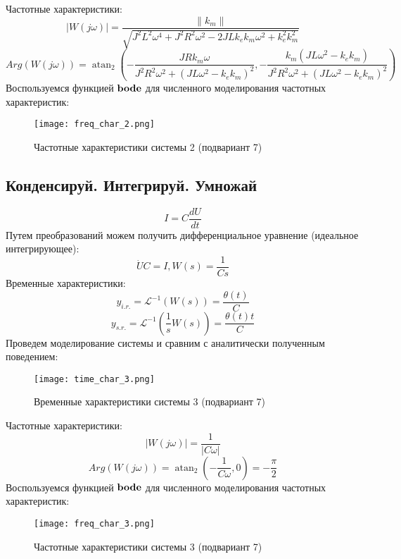 Частотные характеристики:
\begin{equation*}
    |W(j\omega)| = \frac{\|{k_{m}}\|}{\sqrt{J^{2} L^{2} \omega^{4} + J^{2} R^{2} \omega^{2} - 2 J L k_{e} k_{m} \omega^{2} + k_{e}^{2} k_{m}^{2}}}
\end{equation*}
\begin{equation*}
    Arg(W(j\omega)) = \operatorname{atan}_{2}{(- \frac{J R k_{m} \omega}{J^{2} R^{2} \omega^{2} + (J L \omega^{2} - k_{e} k_{m})^{2}},- \frac{k_{m} (J L \omega^{2} - k_{e} k_{m})}{J^{2} R^{2} \omega^{2} + (J L \omega^{2} - k_{e} k_{m})^{2}} )}
\end{equation*}
Воспользуемся функцией $\bold{bode}$ для численного моделирования частотных характеристик:
\begin{figure}[h]
    \centering
    \texttt{[image: freq\_char\_2.png]}
    \caption{\label{fig:The-caption-1}Частотные характеристики системы 2 (подвариант 7)}
\end{figure}
\pagebreak

\subsection*{Конденсируй. Интегрируй. Умножай}
\begin{equation}
    I = C\frac{dU}{dt}
\end{equation}
Путем преобразований можем получить дифференциальное уравнение (идеальное интегрирующее):
\begin{equation*}
    \dot{U}C = I, W(s)=\frac{1}{Cs}
\end{equation*}
Временные характеристики:
\begin{equation*}
    y_{i.r.}=\mathcal{L}^{-1}(W(s)) = \frac{\theta(t)}{C}
\end{equation*}
\begin{equation*}
    y_{s.r.}=\mathcal{L}^{-1}(\frac{1}{s}W(s)) = \frac{\theta(t)t}{C}
\end{equation*}
Проведем моделирование системы и сравним с аналитически полученным поведением:
\begin{figure}[h]
    \centering
    \texttt{[image: time\_char\_3.png]}
    \caption{\label{fig:The-caption-1}Временные характеристики системы 3 (подвариант 7)}
\end{figure}

Частотные характеристики:
\begin{equation*}
    |W(j\omega)| = \frac{1}{|C\omega|}
\end{equation*}
\begin{equation*}
    Arg(W(j\omega)) = \operatorname{atan}_{2}{(-\frac{1}{C\omega},0)}=-\frac{\pi}{2}
\end{equation*}
Воспользуемся функцией $\bold{bode}$ для численного моделирования частотных характеристик:
\begin{figure}[]
    \centering
    \texttt{[image: freq\_char\_3.png]}
    \caption{\label{fig:The-caption-1}Частотные характеристики системы 3 (подвариант 7)}
\end{figure}
\pagebreak

